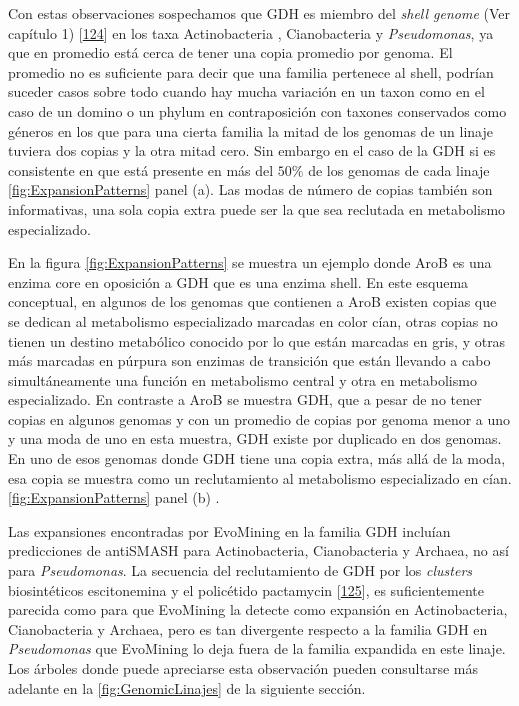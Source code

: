 \documentclass[12pt,twoside]{reedthesis}
\begin{document}
  Con estas observaciones sospechamos que GDH es miembro del \emph{shell
  genome} (Ver capítulo 1)
  {[}\protect\hyperlink{ref-koonin_genomics_2008}{124}{]} en los taxa
  Actinobacteria , Cianobacteria y \emph{Pseudomonas}, ya que en promedio
  está cerca de tener una copia promedio por genoma. El promedio no es
  suficiente para decir que una familia pertenece al shell, podrían
  suceder casos sobre todo cuando hay mucha variación en un taxon como en
  el caso de un domino o un phylum en contraposición con taxones
  conservados como géneros en los que para una cierta familia la mitad de
  los genomas de un linaje tuviera dos copias y la otra mitad cero. Sin
  embargo en el caso de la GDH si es consistente en que está presente en
  más del \(50\%\) de los genomas de cada linaje
  \autoref{fig:ExpansionPatterns} panel (a). Las modas de número de copias
  también son informativas, una sola copia extra puede ser la que sea
  reclutada en metabolismo especializado.
  
  En la figura \autoref{fig:ExpansionPatterns} se muestra un ejemplo donde
  AroB es una enzima core en oposición a GDH que es una enzima shell. En
  este esquema conceptual, en algunos de los genomas que contienen a AroB
  existen copias que se dedican al metabolismo especializado marcadas en
  color cían, otras copias no tienen un destino metabólico conocido por lo
  que están marcadas en gris, y otras más marcadas en púrpura son enzimas
  de transición que están llevando a cabo simultáneamente una función en
  metabolismo central y otra en metabolismo especializado. En contraste a
  AroB se muestra GDH, que a pesar de no tener copias en algunos genomas y
  con un promedio de copias por genoma menor a uno y una moda de uno en
  esta muestra, GDH existe por duplicado en dos genomas. En uno de esos
  genomas donde GDH tiene una copia extra, más allá de la moda, esa copia
  se muestra como un reclutamiento al metabolismo especializado en cían.
  \autoref{fig:ExpansionPatterns} panel (b) .
  
  Las expansiones encontradas por EvoMining en la familia GDH incluían
  predicciones de antiSMASH para Actinobacteria, Cianobacteria y Archaea,
  no así para \emph{Pseudomonas}. La secuencia del reclutamiento de GDH
  por los \emph{clusters} biosintéticos escitonemina y el policétido
  pactamycin {[}\protect\hyperlink{ref-kudo_cloning_2007}{125}{]}, es
  suficientemente parecida como para que EvoMining la detecte como
  expansión en Actinobacteria, Cianobacteria y Archaea, pero es tan
  divergente respecto a la familia GDH en \emph{Pseudomonas} que EvoMining
  lo deja fuera de la familia expandida en este linaje. Los árboles donde
  puede apreciarse esta observación pueden consultarse más adelante en la
  \autoref{fig:GenomicLinajes} de la siguiente sección.
  
\end{document}
